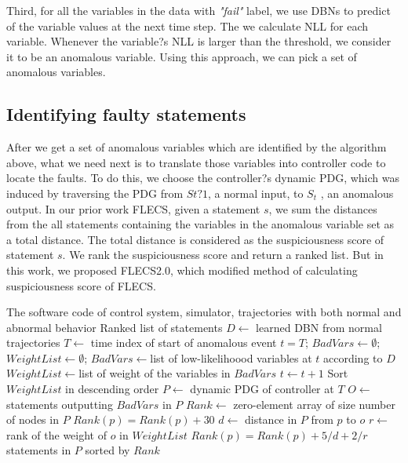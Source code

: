 Third, for all the variables in the data with {\it "fail"} label, we use DBNs to predict of the variable values at the next time step. The we calculate NLL for each variable. Whenever the variable?s NLL is larger than the threshold, we consider it to be an anomalous variable. Using this approach, we can pick a set of anomalous variables.

\subsection{Identifying faulty statements}
After we get a set of anomalous variables which are identified by the algorithm above, what we need next is to translate those variables into controller code to locate the faults. To do this,
we choose the controller?s dynamic PDG, which was induced by traversing the PDG from $S{t ?1}$, a normal input, to $S_t$ , an anomalous output. In our prior work FLECS, given a statement $s$, we sum the distances from the all statements containing the variables in the anomalous variable set as a total distance. The total distance is considered as the suspiciousness score of statement $s$. We rank the suspiciousness score and return a ranked list. But in this work, we proposed FLECS2.0, which modified method of calculating suspiciousness score of FLECS. 

\renewcommand{\algorithmicrequire}{\textbf{Input:}}
\renewcommand{\algorithmicensure}{\textbf{Output:}}
\begin{algorithm}
  \label{flecs2.0}
  \begin{algorithmic}[1]
    \Require The software code of control system, simulator, trajectories with both normal and abnormal behavior
    \Ensure Ranked list of statements
    \State $D\leftarrow$ learned DBN from normal trajectories
    \State $T\leftarrow$ time index of start of anomalous event
    \State $t=T$; $BadVars\leftarrow \emptyset$; $WeightList\leftarrow \emptyset$; 
    	\State $BadVars\leftarrow$list of low-likelihoood variables at $t$ according to $D$
	\State $WeightList\leftarrow$list of weight of the variables in $BadVars$
	\State $t \leftarrow t+1$
    \EndWhile
    \State Sort $WeightList$ in descending order
    \State $P\leftarrow$ dynamic PDG of controller at $T$
    \State $O\leftarrow$ statements outputting $BadVars$ in $P$
    \State $Rank\leftarrow$ zero-element array of size number of nodes in $P$  
            		\State $Rank(p)=Rank(p)+30$
			\State $d \leftarrow$ distance in $P$ from $p$ to $o$
			\State $r \leftarrow$ rank of the weight of $o$ in $WeightList$
            		\State $Rank(p)=Rank(p)+5/d+2/r$
        		\EndIf
   	    \EndFor
    \EndFor
    \Return statements in $P$ sorted by $Rank$
  \end{algorithmic}
\end{algorithm}


